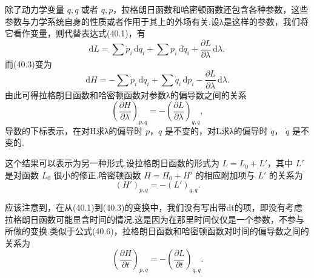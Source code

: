 除了动力学变量 $q,\dot{q}$ 或者 $q,p$，拉格朗日函数和哈密顿函数还包含各种参数，这些参数与力学系统自身的性质或者作用于其上的外场有关.设λ是这样的参数，我们将它看作变量，则代替表达式(40.1)，有
\begin{equation*}
  \mathrm{d}L=\sum\dot{p}_i\,\mathrm{d}q_i+\sum p_i\,\mathrm{d}\dot{q}_i
  +\frac{\partial L}{\partial\lambda}\,\mathrm{d}\lambda,
\end{equation*}
而(40.3)变为
\begin{equation*}
  \mathrm{d}H=-\sum\dot{p}_i\,\mathrm{d}q_i+\sum\dot{q}_i\,\mathrm{d}p_i
  -\frac{\partial L}{\partial\lambda}\,\mathrm{d}\lambda.
\end{equation*}
由此可得拉格朗日函数和哈密顿函数对参数λ的偏导数之间的关系
\begin{equation}
  \left(\frac{\partial H}{\partial\lambda}\right)_{p,q}
  =-\left(\frac{\partial L}{\partial\lambda}\right)_{\dot{q},q},
\end{equation}
导数的下标表示，在对H求λ的偏导时 $p$，$q$ 是不变的，对L求λ的偏导时 $q$，
$\dot{q}$ 是不变的.

这个结果可以表示为另一种形式.设拉格朗日函数的形式为 $L=L_0+L'$，其中 $L'$
是对函数 $L_0$ 很小的修正.哈密顿函数 $H=H_0+H'$ 的相应附加项与 $L'$ 的关系为
\begin{equation}
  \left(H'\right)_{p,q}=-\left(L'\right)_{\dot{q},q}.
\end{equation}

应该注意到，在从(40.1)到(40.3)的变换中，我们没有写出带dt的项，即没有考虑拉格朗日函数可能显含时间的情况.这是因为在那里时间仅仅是一个参数，不参与所做的变换.类似于公式(40.6)，拉格朗日函数和哈密顿函数对时间的偏导数之间的关系为
\begin{equation}
  \left(\frac{\partial H}{\partial t}\right)_{p,q}
  =-\left(\frac{\partial L}{\partial t}\right)_{\dot{q},q}.
\end{equation}

